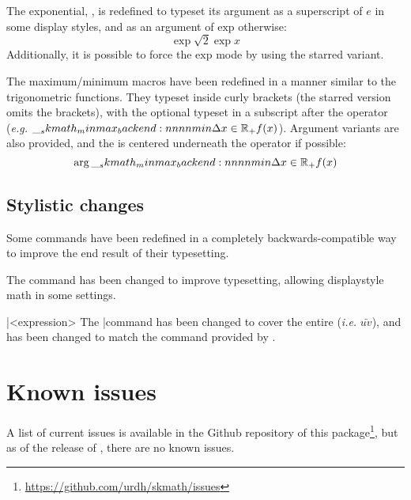 \documentclass[commonsets,load]{skdoc}
\begin{document}
  \DescribeMacro{}
  The exponential, \Macro\exp, is redefined to typeset its argument as a
  superscript of \(e\) in some display styles, and as an argument of
  \(\mathrm{exp}\) otherwise:
  \begin{equation*}
    \exp{\sqrt{2}\exp{x}}
  \end{equation*}
  Additionally, it is possible to force the \(\mathrm{exp}\) mode by
  using the starred variant.

  \DescribeMacro{}
  \DescribeMacro{}
  \DescribeMacro{}
  \DescribeMacro{}
  \DescribeMacro{}
  \DescribeMacro{}
  The maximum/minimum macros have been redefined in a manner similar to
  the trigonometric functions. They typeset  inside
  curly brackets (the starred version omits the brackets), with the
  optional  typeset in a subscript after the operator
  (\emph{e.g.} \(\min*[x\in\R_{+}]{f(x)}\)). Argument variants are also
  provided, and the  is centered underneath the operator
  if possible:
  \begin{equation*}
    \argmin*[x\in\R_{+}]{f(x)}
  \end{equation*}

  \subsection{Stylistic changes}
  Some commands have been redefined in a completely backwards-compatible
  way to improve the end result of their typesetting.
 
  \DescribeMacro{}
  The \Macro\frac command has been changed to improve typesetting,
  allowing displaystyle math in some settings.
 
  \DescribeMacro\bar{<expression>}
  \DescribeMacro{}
  The \Macro\bar command has been changed to cover the entire 
   (\emph{i.e.} \(\bar{uv}\)), and \Macro\vec has
  been changed to match the  command provided by 
  .

  \section{Known issues}
  A list of current issues is available in the Github repository of this
  package\footnote{\url{https://github.com/urdh/skmath/issues}}, but as
  of the release of \theversion, there are no known issues.
\end{document}
